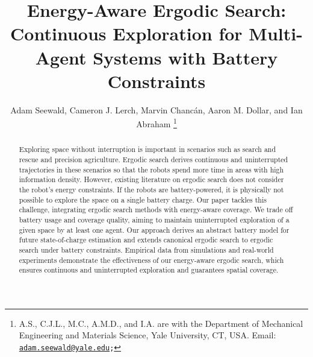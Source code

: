 \documentclass[letterpaper,10pt,conference,twoside]{IEEEtran}
\theoremstyle{definition}
\begin{document}

\title{\LARGE\bf Energy-Aware Ergodic Search: Continuous Exploration for Multi-Agent Systems with Battery Constraints}

\author{Adam Seewald, Cameron J. Lerch, Marvin Chanc{\'a}n, Aaron M. Dollar, and Ian Abraham
  \thanks{A.\hspace*{.4ex}S., C.\hspace*{.4ex}J.\hspace*{.4ex}L., M.\hspace*{.4ex}C., A.\hspace*{.4ex}M.\hspace*{.4ex}D., and I.\hspace*{.4ex}A. are with the Department of Mechanical Engineering and Materials Science, Yale University, CT, USA. Email: {\tt\footnotesize \href{mailto:adam.seewald@yale.edu}{adam.seewald@yale.edu};}}
}

\maketitle

\begin{abstract} 
  Exploring space without interruption is important in scenarios such as search and rescue and precision agriculture. Ergodic search derives continuous and uninterrupted trajectories in these scenarios so that the robots spend more time in areas with high information density. 
  However, existing literature on ergodic search does not consider the robot's energy constraints. 
  If the robots are battery-powered, it is physically not possible to explore the space on a single battery charge. Our paper tackles this challenge, integrating ergodic search methods with energy-aware coverage. We trade off battery usage and coverage quality, aiming to maintain uninterrupted exploration of a given space by at least one agent. Our approach derives an abstract battery model for future state-of-charge estimation and extends canonical ergodic search to ergodic search under battery constraints. Empirical data from simulations and real-world experiments demonstrate the effectiveness of our energy-aware ergodic search, which ensures continuous and uninterrupted exploration and guarantees spatial coverage.
\end{abstract}
\end{document}
